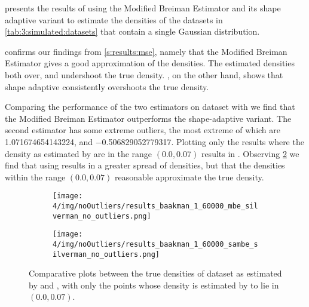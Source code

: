 
\begin{figure*}
	\centering
	
	\caption{Comparative plots for dataset \ferdosiOneNum, \baakmanOneNum, \baakmanFourNum, and \baakmanFiveNum.
	}
	\label{fig:4:results:singleSphere}
\end{figure*}

	 presents the results of using the Modified Breiman Estimator and its shape adaptive variant to estimate the densities of the datasets in \cref{tab:3:simulated:datasets} that contain a single Gaussian distribution. 

	 confirms our findings from \cref{s:results:mse}, namely that the Modified Breiman Estimator gives a good approximation of the densities. The estimated densities both over, and undershoot the true density. , on the other hand, shows that shape adaptive \mbe consistently overshoots the true density. 

	Comparing the performance of the two estimators on dataset \baakmanOne with  we find that the Modified Breiman Estimator outperforms the shape-adaptive variant. The second estimator has some extreme outliers, the most extreme of which are \num{1.071674654143224}, and \num{-0.506829052779317}. 
	Plotting only the results where the density as estimated by \sambe are in the range $\left(\num{0.0}, \num[round-precision=1]{0.07} \right)$ results in . Observing \cref{fig:results:baakman1::noOUtliers:sambe} we find that using \sambe results in a greater spread of densities, but that the densities within the range $\left(\num[round-precision=1]{0.0}, \num[round-precision=1]{0.07} \right)$ reasonable approximate the true density.
	\begin{figure}[!ht]
		\centering
		\begin{subfigure}{0.6\columnwidth}
			\centering
			\texttt{[image: 4/img/noOutliers/results\_baakman\_1\_60000\_mbe\_silverman\_no\_outliers.png]}
			\caption{\mbe}
			\label{fig:results:baakman1:noOutliers:mbe}
		\end{subfigure}
		\begin{subfigure}{0.6\columnwidth}
			\centering
			\texttt{[image: 4/img/noOutliers/results\_baakman\_1\_60000\_sambe\_silverman\_no\_outliers.png]}
			\caption{\sambe}
			\label{fig:results:baakman1::noOUtliers:sambe}
		\end{subfigure}	
		\caption{Comparative plots between the true densities of dataset \baakmanOneNum as estimated by  \mbe and  \sambe, with only the points whose density is estimated by \sambe to lie in $\left(\num{0.0}, \num[round-precision=1]{0.07} \right)$.}
		\label{fig:results:baakman1:noOutliers}
	\end{figure}

